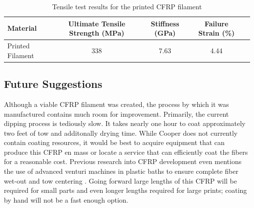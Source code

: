 \begin{table}[h]
    \centering
    \begin{tabular}{lcccc}
        Material           & Ultimate Tensile Strength (MPa)   & Stiffness (GPa)    & Failure Strain (\%)  \\ \hline
		Printed Filament & 338 & 7.63 & 4.44
    \end{tabular}
    \caption{Tensile test results for the printed CFRP filament}
    \label{tab:printed-filament-results}
\end{table}

\clearpage

\subsection{Future Suggestions}

\indent

Although a viable CFRP filament was created, the process by which it was manufactured contains much room for improvement. Primarily, the current dipping process is tediously slow. It takes nearly one hour to coat approximately two feet of tow and additonally drying time. While Cooper does not currently contain coating resources, it would be best to acquire equipment that can produce this CFRP en mass or locate a service that can efficiently coat the fibers for a reasonable cost. Previous research into CFRP development even mentions the use of advanced venturi machines in plastic baths to ensure complete fiber wet-out and tow centering \cite{Thermoplastic-NASA}. Going forward large lengths of this CFRP will be required for small parts and even longer lengths required for large prints; coating by hand will not be a fast enough option.